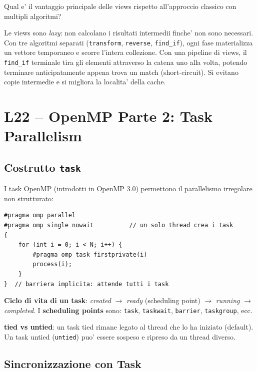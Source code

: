 \documentclass[11pt,a4paper]{article}
\theoremstyle{remark}
\newenvironment{esercizio}[1][]{%
  \begin{tcolorbox}[breakable,title={\textbf{Esercizio / Domanda d'esame}\ifx&#1&\else: #1\fi},
    colback=yellow!5!white, colframe=orange!75!black, fonttitle=\small\bfseries]%
}{%
  \end{tcolorbox}%
}
\newenvironment{risposta}{%
  \begin{tcolorbox}[breakable,title={\textbf{Risposta}},
    colback=green!5!white, colframe=green!50!black, fonttitle=\small\bfseries]%
}{%
  \end{tcolorbox}%
}
\begin{document}
\begin{esercizio}
Qual e' il vantaggio principale delle views rispetto all'approccio classico con multipli algoritmi?
\end{esercizio}
\begin{risposta}
Le views sono \emph{lazy}: non calcolano i risultati intermedii finche' non sono necessari. Con tre algoritmi separati (\lstinline|transform|, \lstinline|reverse|, \lstinline|find_if|), ogni fase materializza un vettore temporaneo e scorre l'intera collezione. Con una pipeline di views, il \lstinline|find_if| terminale tira gli elementi attraverso la catena uno alla volta, potendo terminare anticipatamente appena trova un match (short-circuit). Si evitano copie intermedie e si migliora la localita' della cache.
\end{risposta}

\section{L22 -- OpenMP Parte 2: Task Parallelism}

\subsection{Costrutto \texttt{task}}

I task OpenMP (introdotti in OpenMP 3.0) permettono il parallelismo irregolare non strutturato:
\begin{lstlisting}[style=cpp]
#pragma omp parallel
#pragma omp single nowait          // un solo thread crea i task
{
    for (int i = 0; i < N; i++) {
        #pragma omp task firstprivate(i)
        process(i);
    }
}  // barriera implicita: attende tutti i task
\end{lstlisting}

\textbf{Ciclo di vita di un task}: \emph{created} $\to$ \emph{ready} (scheduling point) $\to$ \emph{running} $\to$ \emph{completed}. I \textbf{scheduling points} sono: \lstinline|task|, \lstinline|taskwait|, \lstinline|barrier|, \lstinline|taskgroup|, ecc.

\textbf{tied vs untied}: un task tied rimane legato al thread che lo ha iniziato (default). Un task untied (\lstinline|untied|) puo' essere sospeso e ripreso da un thread diverso.

\subsection{Sincronizzazione con Task}
\end{document}
